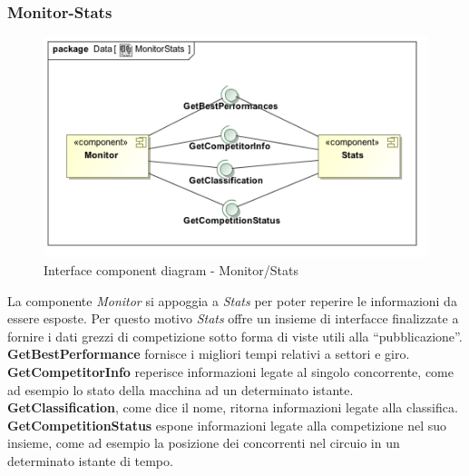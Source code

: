 \subsubsection{Monitor-Stats}
\begin{center}
\begin{figure}[h!]
	\includegraphics[scale=0.55]{img/InteractionDiagram/Implementation_Diagram__MonitorStats.jpg}
\caption{Interface component diagram - Monitor/Stats}
\end{figure}
\end{center}
La componente \emph{Monitor} si appoggia a \emph{Stats} per poter reperire le informazioni da essere esposte. Per questo motivo
\emph{Stats} offre un insieme di interfacce finalizzate a fornire i dati grezzi di competizione sotto forma di viste utili alla ``pubblicazione''.\\
\textbf{GetBestPerformance} fornisce i migliori tempi relativi a settori e giro.\\
\textbf{GetCompetitorInfo} reperisce informazioni legate al singolo concorrente, come ad esempio lo stato della macchina ad un determinato istante.\\
\textbf{GetClassification}, come dice il nome, ritorna informazioni legate alla classifica.\\
\textbf{GetCompetitionStatus} espone informazioni legate alla competizione nel suo insieme, come ad esempio la posizione dei concorrenti nel circuio
in un determinato istante di tempo.
